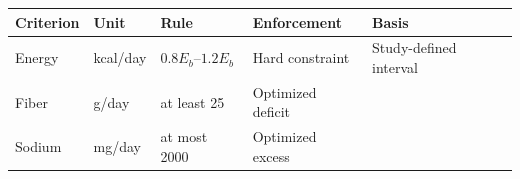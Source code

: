\begin{tabularx}{\textwidth}{l l X X X}
\toprule
Criterion & Unit & Rule & Enforcement & Basis \\
\midrule
Energy & kcal/day & $0.8E_b$--$1.2E_b$ & Hard constraint & Study-defined interval \\
\midrule
Fiber & g/day & at least 25 & Optimized deficit & \cite{who2018healthydiet} \\
\midrule
Sodium & mg/day & at most 2000 & Optimized excess & \cite{who2018healthydiet} \\
\midrule
\bottomrule
\end{tabularx}
